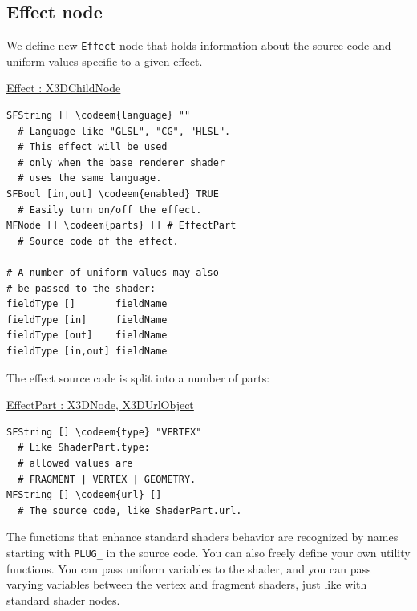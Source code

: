 \documentclass{egpubl}
\newenvironment{mycode}
{\begin{mycodecore}}
{\end{mycodecore}
\vspace{-0.1in}}
\newcommand*{\codeem}[1]{\textbf{#1}}
\begin{document}
\subsection{Effect node}

We define new \texttt{Effect} node that holds information about
the source code and uniform values specific to a given effect.

\begin{mycode}
\underline{Effect : X3DChildNode}
\begin{Verbatim}[commandchars=\\\{\},fontsize=\small]
SFString [] \codeem{language} ""
  # Language like "GLSL", "CG", "HLSL".
  # This effect will be used
  # only when the base renderer shader
  # uses the same language.
SFBool [in,out] \codeem{enabled} TRUE
  # Easily turn on/off the effect.
MFNode [] \codeem{parts} [] # EffectPart
  # Source code of the effect.

# A number of uniform values may also
# be passed to the shader:
fieldType []       fieldName
fieldType [in]     fieldName
fieldType [out]    fieldName
fieldType [in,out] fieldName
\end{Verbatim}
\end{mycode}



\needspace{1in}
The effect source code is split into a number of parts:

\begin{mycode}
\underline{EffectPart : X3DNode, X3DUrlObject}
\begin{Verbatim}[commandchars=\\\{\},fontsize=\small]
SFString [] \codeem{type} "VERTEX"
  # Like ShaderPart.type:
  # allowed values are
  # FRAGMENT | VERTEX | GEOMETRY.
MFString [] \codeem{url} []
  # The source code, like ShaderPart.url.
\end{Verbatim}
\end{mycode}


The functions that enhance standard shaders behavior are recognized
by names starting with \texttt{PLUG\_} in the source code.
You can also freely define your own utility functions.
You can pass uniform variables to the shader,
and you can pass varying variables between the vertex and fragment
shaders, just like with standard shader nodes.
\end{document}
